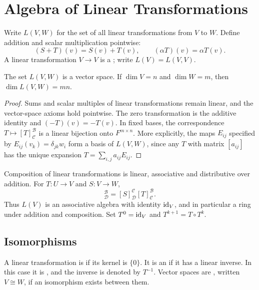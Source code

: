\section{Algebra of Linear Transformations}\label{sec:AlgebraTransformations}

\begin{Definition}
Write $L(V,W)$ for the set of all linear transformations from $V$ to $W$. Define addition and scalar multiplication pointwise:
\begin{equation*}
(S+T)(v)=S(v)+T(v),\qquad (\alpha T)(v)=\alpha T(v).
\end{equation*}
A linear transformation $V\to V$ is a ; write $L(V)=L(V,V)$.
\end{Definition}

\begin{Theorem}
The set $L(V,W)$ is a vector space. If $\dim V=n$ and $\dim W=m$, then $\dim L(V,W)=mn$.
\end{Theorem}
\begin{proof}
Sums and scalar multiples of linear transformations remain linear, and the vector-space axioms hold pointwise. The zero transformation is the additive identity and $(-T)(v)=-T(v)$. In fixed bases, the correspondence $T\mapsto[T]_{\mathcal C}^{\mathcal B}$ is a linear bijection onto $F^{m\times n}$. More explicitly, the maps $E_{ij}$ specified by $E_{ij}(v_k)=\delta_{jk}w_i$ form a basis of $L(V,W)$, since any $T$ with matrix $[a_{ij}]$ has the unique expansion $T=\sum_{i,j}a_{ij}E_{ij}$.
\end{proof}

Composition of linear transformations is linear, associative and distributive over addition. For $T\colon U\to V$ and $S\colon V\to W$,
\begin{equation*}
[S\circ T]_{\mathcal D}^{\mathcal B}=[S]_{\mathcal D}^{\mathcal C}[T]_{\mathcal C}^{\mathcal B}.
\end{equation*}
Thus $L(V)$ is an associative algebra with identity $\mathrm{id}_V$, and in particular a ring under addition and composition. Set $T^0=\mathrm{id}_V$ and $T^{k+1}=T\circ T^k$.

\subsection{Isomorphisms}

\begin{Definition}
A linear transformation is  if its kernel is $\{0\}$. It is an  if it has a linear inverse. In this case it is , and the inverse is denoted by $T^{-1}$. Vector spaces are , written $V\cong W$, if an isomorphism exists between them.
\end{Definition}

